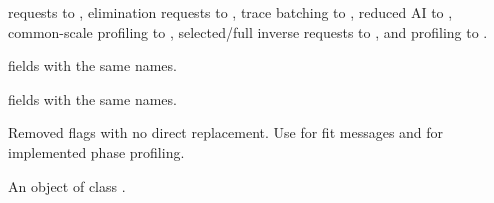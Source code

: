 \documentclass[a4paper]{book}
\begin{document}
\begin{Details}
\begin{description}
requests to , elimination requests to ,
trace batching to , reduced AI to ,
common-scale profiling to , selected/full inverse requests to
, and profiling to .
\item[\code{denseMemoryMB}, \code{memoryPolicy}, \code{gpu},
\code{gpuMinSize}, \code{blasThreads}]  fields with the same
names.
\item[\code{verbose}, \code{dateWarning}]  fields with the
same names.
\item[\code{recordDiagnostics}, \code{verboseDiagnostics}] Removed flags with
no direct replacement. Use  for fit messages and
 for implemented phase profiling.

\end{description}

\end{Details}
%
\begin{Value}
An object of class .
\end{Value}
%
\end{document}
